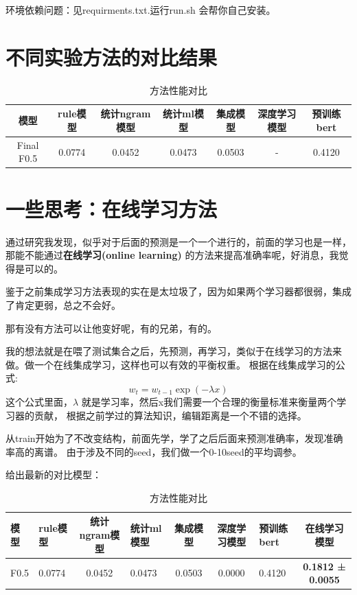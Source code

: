 \documentclass[answers]{exam}  %
\begin{document}
环境依赖问题：见requirments.txt.运行run.sh 会帮你自己安装。


\section{不同实验方法的对比结果}

\begin{table}[H]
    \centering
    \begin{tabular}{ccccccc}
    \toprule
    \textbf{模型} & \textbf{rule模型} & \textbf{统计ngram模型} & \textbf{统计ml模型} & \textbf{集成模型} & \textbf{深度学习模型} & \textbf{预训练bert}\\
    \midrule
    Final F0.5 & 0.0774 & 0.0452 & 0.0473 & 0.0503 & - & 0.4120\\
    \bottomrule
    \end{tabular}
    \caption{方法性能对比}
    \end{table}

\section{一些思考：在线学习方法}

通过研究我发现，似乎对于后面的预测是一个一个进行的，前面的学习也是一样，那能不能通过\textbf{在线学习(online learning)}
的方法来提高准确率呢，好消息，我觉得是可以的。

鉴于之前集成学习方法表现的实在是太垃圾了，因为如果两个学习器都很弱，集成了肯定更弱，总之不会好。

那有没有方法可以让他变好呢，有的兄弟，有的。

我的想法就是在喂了测试集合之后，先预测，再学习，类似于在线学习的方法来做。做一个在线集成学习，这样也可以有效的平衡权重。
根据在线集成学习的公式:
\[ w_t = w_{t-1} \exp(-\lambda x) \]
这个公式里面，$\lambda$ 就是学习率，然后x我们需要一个合理的衡量标准来衡量两个学习器的贡献，
根据之前学过的算法知识，编辑距离是一个不错的选择。

从train开始为了不改变结构，前面先学，学了之后后面来预测准确率，发现准确率高的离谱。
由于涉及不同的seed，我们做一个0-10seed的平均调参。

给出最新的对比模型：

\begin{table}[h]
    \centering
    \begin{tabular}{p{0.5cm}p{0.8cm}cp{1.3cm}ccp{1.2cm}c}
    \toprule
    \textbf{模型} & \textbf{rule模型} & \textbf{统计ngram模型} & \textbf{统计ml模型} & \textbf{集成模型} & \textbf{深度学习模型} & \textbf{预训练bert} &\textbf{在线学习模型}\\
    \midrule
    F0.5 & 0.0774 & 0.0452 & 0.0473 & 0.0503 & 0.0000 & 0.4120 & \textbf{0.1812 ± 0.0055} \\
    \bottomrule
    \end{tabular}
    \caption{方法性能对比}
\end{table}
\end{document}
